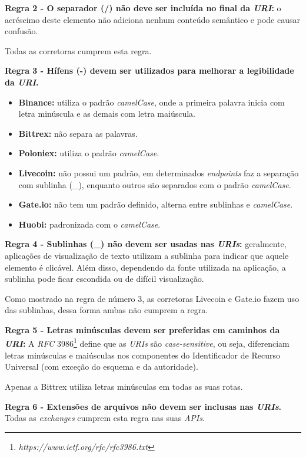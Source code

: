 \textbf{Regra 2 - O separador (/) não deve ser incluída no final da \textit{URI}:} o acréscimo deste elemento não adiciona nenhum conteúdo semântico e pode causar confusão.

Todas as corretoras cumprem esta regra.

\textbf{Regra 3 - Hífens (-) devem ser utilizados para melhorar a legibilidade da \textit{URI}.}

\begin{itemize}
    \item \textbf{Binance:} utiliza o padrão \textit{camelCase}, onde a primeira palavra inicia com letra minúscula e as demais com letra maiúscula.
    \item \textbf{Bittrex:} não separa as palavras.
    \item \textbf{Poloniex:} utiliza o padrão \textit{camelCase}.
    \item \textbf{Livecoin:} não possui um padrão, em determinados \textit{endpoints} faz a separação com sublinha (\_), enquanto outros são separados com o padrão \textit{camelCase}.
    \item \textbf{Gate.io:} não tem um padrão definido, alterna entre sublinhas e \textit{camelCase}.
    \item \textbf{Huobi:} padronizada com o \textit{camelCase}.
\end{itemize}

\textbf{Regra 4 - Sublinhas (\_) não devem ser usadas nas \textit{URIs}:} geralmente, aplicações de visualização de texto utilizam a sublinha para indicar que aquele elemento é clicável. Além disso, dependendo da fonte utilizada na aplicação, a sublinha pode ficar escondida ou de difícil visualização.

Como mostrado na regra de número 3, as corretoras Livecoin e Gate.io fazem uso das sublinhas, dessa forma ambas não cumprem a regra.

\textbf{Regra 5 - Letras minúsculas devem ser preferidas em caminhos da \textit{URI}:} A \textit{RFC} 3986\footnote{\em https://www.ietf.org/rfc/rfc3986.txt} define que as \textit{URIs} são \textit{case-sensitive}, ou seja, diferenciam letras minúsculas e maiúsculas nos componentes do Identificador de Recurso Universal (com exceção do esquema e da autoridade).

Apenas a Bittrex utiliza letras minúsculas em todas as suas rotas.

\textbf{Regra 6 - Extensões de arquivos não devem ser inclusas nas \textit{URIs}.} Todas as \textit{exchanges} cumprem esta regra nas suas \textit{APIs}.

